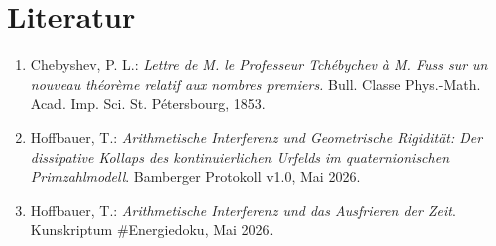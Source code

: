 \documentclass[11pt,a4paper]{article}
\theoremstyle{plain}
\theoremstyle{definition}
\numberwithin{equation}{section}
\begin{document}
\section*{Literatur}
\begin{small}
\begin{enumerate}
    \item[1] Chebyshev, P. L.: \emph{Lettre de M. le Professeur Tchébychev à M. Fuss sur un nouveau théorème relatif aux nombres premiers.} Bull. Classe Phys.-Math. Acad. Imp. Sci. St. Pétersbourg, 1853.
    \item[2] Hoffbauer, T.: \emph{Arithmetische Interferenz und Geometrische Rigidität: Der dissipative Kollaps des kontinuierlichen Urfelds im quaternionischen Primzahlmodell}. Bamberger Protokoll v1.0, Mai 2026.
    \item[3] Hoffbauer, T.: \emph{Arithmetische Interferenz und das Ausfrieren der Zeit}. Kunskriptum \#Energiedoku, Mai 2026.
\end{enumerate}
\end{small}
\end{document}
